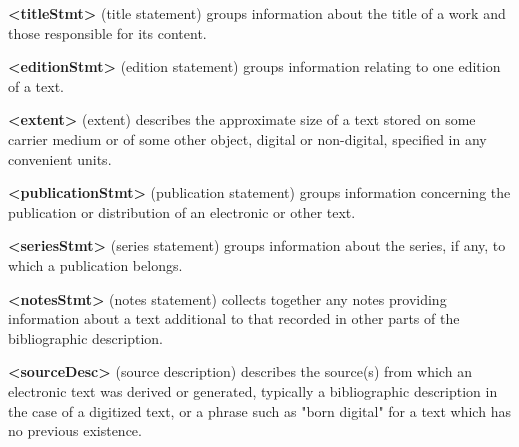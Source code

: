 \begin{sansreflist}
  
\item [\textbf{<titleStmt>}] (title statement) groups information about the title of a work and those responsible for its content.
\item [\textbf{<editionStmt>}] (edition statement) groups information relating to one edition of a text.
\item [\textbf{<extent>}] (extent) describes the approximate size of a text stored on some carrier medium or of some other object, digital or non-digital, specified in any convenient units.
\item [\textbf{<publicationStmt>}] (publication statement) groups information concerning the publication or distribution of an electronic or other text.
\item [\textbf{<seriesStmt>}] (series statement) groups information about the series, if any, to which a publication belongs.
\item [\textbf{<notesStmt>}] (notes statement) collects together any notes providing information about a text additional to that recorded in other parts of the bibliographic description.
\item [\textbf{<sourceDesc>}] (source description) describes the source(s) from which an electronic text was derived or generated, typically a bibliographic description in the case of a digitized text, or a phrase such as "born digital" for a text which has no previous existence.
\end{sansreflist}
\par
